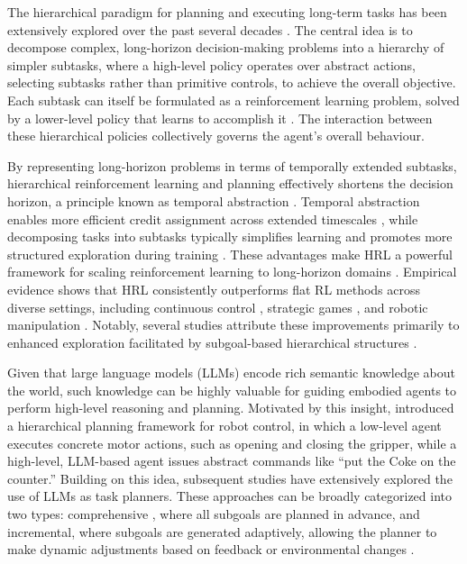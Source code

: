 
The hierarchical paradigm for planning and executing long-term tasks has been extensively explored over the past several decades \citep{BercherAL2019, PateriaSTQ2021}. The central idea is to decompose complex, long-horizon decision-making problems into a hierarchy of simpler subtasks, where a high-level policy operates over abstract actions, selecting subtasks rather than primitive controls, to achieve the overall objective. Each subtask can itself be formulated as a reinforcement learning problem, solved by a lower-level policy that learns to accomplish it \citep{Hengst2010}. The interaction between these hierarchical policies collectively governs the agent's overall behaviour.

By representing long-horizon problems in terms of temporally extended subtasks, hierarchical reinforcement learning and planning effectively shortens the decision horizon, a principle known as temporal abstraction \citep{BartoM2003, Dietterich2000, SuttonPS2000}. Temporal abstraction enables more efficient credit assignment across extended timescales \citep{VezhnevetsOSHJSK2017}, while decomposing tasks into subtasks typically simplifies learning and promotes more structured exploration during training \citep{NachumTLGLL2019}. These advantages make HRL a powerful framework for scaling reinforcement learning to long-horizon domains \citep{DayanH1992, VezhnevetsOSHJSK2017, NachumGLN2018}. Empirical evidence shows that HRL consistently outperforms flat RL methods across diverse settings, including continuous control \citep{FlorensaDA2017, LevyPS2018}, strategic games \citep{VezhnevetsOSHJSK2017, NachumGLN2018}, and robotic manipulation \citep{FoxKSG2017, GuptaKLLH2019}. Notably, several studies attribute these improvements primarily to enhanced exploration facilitated by subgoal-based hierarchical structures \citep{JongHST2008, NachumTLGLL2019}.


Given that large language models (LLMs) encode rich semantic knowledge about the world, such knowledge can be highly valuable for guiding embodied agents to perform high-level reasoning and planning. Motivated by this insight, \citet{AhnBBCC2022} introduced a hierarchical planning framework for robot control, in which a low-level agent executes concrete motor actions, such as opening and closing the gripper, while a high-level, LLM-based agent issues abstract commands like ``put the Coke on the counter.'' Building on this idea, subsequent studies have extensively explored the use of LLMs as task planners. These approaches can be broadly categorized into two types: comprehensive \citep{TangYTZFH2023, DalalCCS2024}, where all subgoals are planned in advance, and incremental, where subgoals are generated adaptively, allowing the planner to make dynamic adjustments based on feedback or environmental changes \citep{IchterBCKFHP2023, ZhangHL2023, WangCMLJLM2024}.



